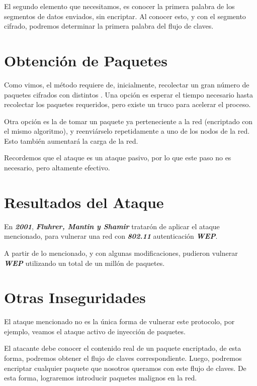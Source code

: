 \documentclass[
]{article}
\begin{document}
El segundo elemento que necesitamos, es conocer la primera palabra de
los segmentos de datos enviados, sin encriptar. Al conocer esto, y con
el segmento cifrado, podremos determinar la primera palabra del flujo de
claves.

\hypertarget{obtenciuxf3n-de-paquetes}{%
\section{Obtención de Paquetes}\label{obtenciuxf3n-de-paquetes}}

Como vimos, el método requiere de, inicialmente, recolectar un gran
número de paquetes cifrados con distintos {}. Una opción es esperar el
tiempo necesario hasta recolectar los paquetes requeridos, pero existe
un truco para acelerar el proceso.

Otra opción es la de tomar un paquete ya perteneciente a la red
(encriptado con el mismo algoritmo), y reenviárselo repetidamente a uno
de los nodos de la red. Esto también aumentará la carga de la red.

Recordemos que el ataque es un ataque pasivo, por lo que este paso no es
necesario, pero altamente efectivo.

\hypertarget{resultados-del-ataque}{%
\section{Resultados del Ataque}\label{resultados-del-ataque}}

En \textbf{\emph{2001}}, \textbf{\emph{Fluhrer, Mantin y Shamir}}
tratarón de aplicar el ataque mencionado, para vulnerar una red con
\textbf{\emph{802.11}} autenticación \textbf{\emph{WEP}}.

A partir de lo mencionado, y con algunas modificaciones, pudieron
vulnerar \textbf{\emph{WEP}} utilizando un total de un millón de
paquetes.

\hypertarget{otras-inseguridades}{%
\section{Otras Inseguridades}\label{otras-inseguridades}}

El ataque mencionado no es la única forma de vulnerar este protocolo,
por ejemplo, veamos el ataque activo de inyección de paquetes.

El atacante debe conocer el contenido real de un paquete encriptado, de
esta forma, podremos obtener el flujo de claves correspondiente. Luego,
podremos encriptar cualquier paquete que nosotros queramos con este
flujo de claves. De esta forma, lograremos introducir paquetes malignos
en la red.
\end{document}
